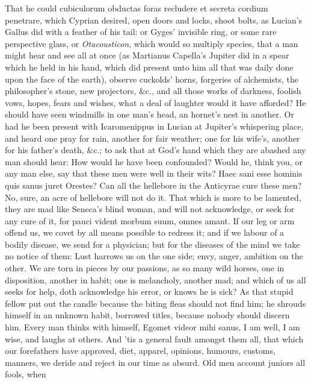{That he could cubiculorum obductas foras recludere et secreta cordium
penetrare, which Cyprian desired, open doors and locks, shoot
bolts, as Lucian's Gallus did with a feather of his tail: or Gyges'
invisible ring, or some rare perspective glass, or \emph{Otacousticon},
which would so multiply species, that a man might hear and see all at
once (as  Martianus Capella's Jupiter did in a spear which he held
in his hand, which did present unto him all that was daily done upon
the face of the earth), observe cuckolds' horns, forgeries of
alchemists, the philosopher's stone, new projectors, \&c., and all those
works of darkness, foolish vows, hopes, fears and wishes, what a deal
of laughter would it have afforded? He should have seen windmills in
one man's head, an hornet's nest in another. Or had he been present
with Icaromenippus in Lucian at Jupiter's whispering place, and
heard one pray for rain, another for fair weather; one for his wife's,
another for his father's death, \&c.; to ask that at God's hand which
they are abashed any man should hear: How would he have been
confounded? Would he, think you, or any man else, say that these men
were well in their wits? Haec sani esse hominis quis sanus juret
Orestes? Can all the hellebore in the Anticyrae cure these men? No,
sure, an acre of hellebore will not do it.
That which is more to be lamented, they are mad like Seneca's blind
woman, and will not acknowledge, or seek for any cure of it, for
pauci vident morbum suum, omnes amant. If our leg or arm offend us, we
covet by all means possible to redress it; and if we labour of a
bodily disease, we send for a physician; but for the diseases of the
mind we take no notice of them: Lust harrows us on the one side;
envy, anger, ambition on the other. We are torn in pieces by our
passions, as so many wild horses, one in disposition, another in habit;
one is melancholy, another mad; and which of us all seeks for
help, doth acknowledge his error, or knows he is sick? As that stupid
fellow put out the candle because the biting fleas should not find him;
he shrouds himself in an unknown habit, borrowed titles, because nobody
should discern him. Every man thinks with himself, Egomet videor mihi
sanus, I am well, I am wise, and laughs at others. And 'tis a general
fault amongst them all, that  which our forefathers have approved,
diet, apparel, opinions, humours, customs, manners, we deride and
reject in our time as absurd. Old men account juniors all fools, when
}

